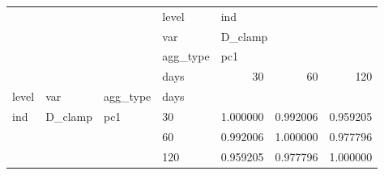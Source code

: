 \begin{tabular}{llllrrr}
\toprule
    &         &     & level & \multicolumn{3}{l}{ind} \\
    &         &     & var & \multicolumn{3}{l}{D\_clamp} \\
    &         &     & agg\_type & \multicolumn{3}{l}{pc1} \\
    &         &     & days &       30  &       60  &       120 \\
level & var & agg\_type & days &           &           &           \\
\midrule
ind & D\_clamp & pc1 & 30  &  1.000000 &  0.992006 &  0.959205 \\
    &         &     & 60  &  0.992006 &  1.000000 &  0.977796 \\
    &         &     & 120 &  0.959205 &  0.977796 &  1.000000 \\
\bottomrule
\end{tabular}
